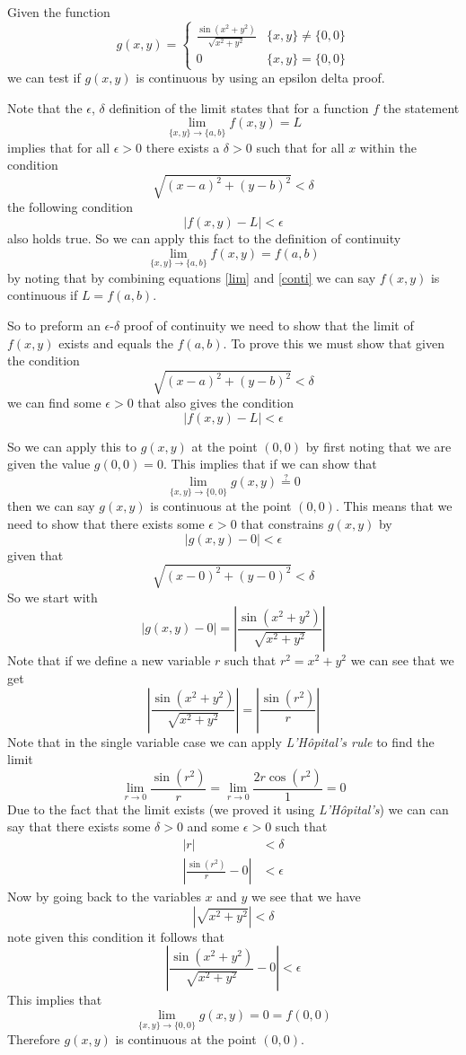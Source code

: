 \documentclass[11pt]{article}
\begin{document}
Given the function
$$g(x,y) = \left\{\begin{array}{cc}
           \frac{\sin(x^2+y^2)}{\sqrt{x^2+y^2}}    &\{x,y\}\ne\{0,0\}\\ 
           0                                       &\{x,y\}=\{0,0\}
           \end{array}\right.$$
we can test if $g(x,y)$ is continuous by using an epsilon delta proof. 

Note that the $\epsilon$, $\delta$ definition of the limit states that for a function $f$ the statement
\begin{equation}
\lim_{\{x,y\}\rightarrow \{a,b\}}f(x,y) = L
\label{lim}
\end{equation}
implies that for all $\epsilon>0$ there exists a $\delta>0$ such that for all $x$ within the condition
$$\sqrt{(x-a)^2+(y-b)^2} < \delta$$
the following condition 
$$|f(x,y) - L|<\epsilon$$
also holds true. So we can apply this fact to the definition of continuity
\begin{equation}
\lim_{\{x,y\}\rightarrow \{a,b\}}f(x,y) = f(a,b)
\label{conti}
\end{equation}
by noting that by combining equations \ref{lim} and \ref{conti} we can say $f(x,y)$ is continuous if $L=f(a,b)$. 

So to preform an $\epsilon$-$\delta$ proof of continuity we need to show that the limit of $f(x,y)$ exists and equals the $f(a,b)$. To prove this we must show that given the condition 
$$\sqrt{(x-a)^2+(y-b)^2} < \delta$$
we can find some $\epsilon>0$ that also gives the condition
$$|f(x,y) - L|<\epsilon$$

So we can apply this to $g(x,y)$ at the point $(0,0)$ by first noting that we are given the value $g(0,0) = 0$. This implies that if we can show that
$$\lim_{\{x,y\}\rightarrow \{0,0\}}g(x,y) \stackrel{?}{=} 0$$
then we can say $g(x,y)$ is continuous at the point $(0,0)$. This means that we need to show that there exists some $\epsilon > 0$ that constrains $g(x,y)$ by
$$|g(x,y) - 0|<\epsilon$$
given that 
$$\sqrt{(x-0)^2+(y-0)^2} < \delta$$
So we start with 
$$\left|g(x,y)-0\right| = \left|\frac{\sin(x^2+y^2)}{\sqrt{x^2+y^2}}\right|$$
Note that if we define a new variable $r$ such that $r^2 = x^2+y^2$ we can see that we get
$$\left|\frac{\sin(x^2+y^2)}{\sqrt{x^2+y^2}}\right| = \left|\frac{\sin(r^2)}{r}\right|$$
Note that in the single variable case we can apply \emph{L'H\^{o}pital's rule} to find the limit
$$\lim_{r\rightarrow0}\frac{\sin(r^2)}{r} = \lim_{r\rightarrow0}\frac{2r\cos(r^2)}{1} = 0$$
Due to the fact that the limit exists (we proved it using \emph{L'H\^{o}pital's}) we can can say that there exists some $\delta>0$ and some $\epsilon>0$ such that
\begin{align*}
|r| &< \delta\\
\left|\frac{\sin(r^2)}{r} - 0\right| &< \epsilon
\end{align*}
Now by going back to the variables $x$ and $y$ we see that we have
$$|\sqrt{x^2+y^2}| < \delta$$
note given this condition it follows that
$$\left|\frac{\sin(x^2+y^2)}{\sqrt{x^2+y^2}} - 0\right| < \epsilon$$
This implies that 
$$\lim_{\{x,y\}\rightarrow \{0,0\}}g(x,y) = 0 = f(0,0)$$
Therefore $g(x,y)$ is continuous at the point $(0,0)$.
\end{document}
